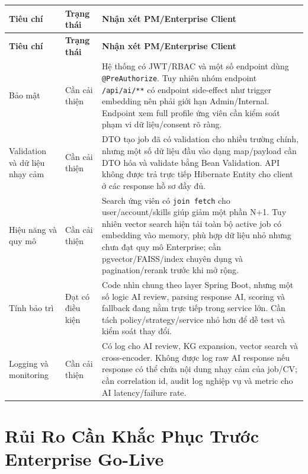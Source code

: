 \documentclass[12pt, a4paper]{report}
\begin{document}
\begin{longtable}{|p{3.2cm}|p{3cm}|p{8cm}|}
\hline
\textbf{Tiêu chí} & \textbf{Trạng thái} & \textbf{Nhận xét PM/Enterprise Client} \\
\hline
\endfirsthead
\hline
\textbf{Tiêu chí} & \textbf{Trạng thái} & \textbf{Nhận xét PM/Enterprise Client} \\
\hline
\endhead
Bảo mật & Cần cải thiện & Hệ thống có JWT/RBAC và một số endpoint dùng \texttt{@PreAuthorize}. Tuy nhiên nhóm endpoint \texttt{/api/ai/**} có endpoint side-effect như trigger embedding nên phải giới hạn Admin/Internal. Endpoint xem full profile ứng viên cần kiểm soát phạm vi dữ liệu/consent rõ ràng. \\
\hline
Validation và dữ liệu nhạy cảm & Cần cải thiện & DTO tạo job đã có validation cho nhiều trường chính, nhưng một số dữ liệu đầu vào dạng map/payload cần DTO hóa và validate bằng Bean Validation. API không được trả trực tiếp Hibernate Entity cho client ở các response hồ sơ đầy đủ. \\
\hline
Hiệu năng và quy mô & Cần cải thiện & Search ứng viên có \texttt{join fetch} cho user/account/skills giúp giảm một phần N+1. Tuy nhiên vector search hiện tải toàn bộ active job có embedding vào memory, phù hợp dữ liệu nhỏ nhưng chưa đạt quy mô Enterprise; cần pgvector/FAISS/index chuyên dụng và pagination/rerank trước khi mở rộng. \\
\hline
Tính bảo trì & Đạt có điều kiện & Code nhìn chung theo layer Spring Boot, nhưng một số logic AI review, parsing response AI, scoring và fallback đang nằm trực tiếp trong service lớn. Cần tách policy/strategy/service nhỏ hơn để dễ test và kiểm soát thay đổi. \\
\hline
Logging và monitoring & Cần cải thiện & Có log cho AI review, KG expansion, vector search và cross-encoder. Không được log raw AI response nếu response có thể chứa nội dung nhạy cảm của job/CV; cần correlation id, audit log nghiệp vụ và metric cho AI latency/failure rate. \\
\hline
\end{longtable}

\section{Rủi Ro Cần Khắc Phục Trước Enterprise Go-Live}
\end{document}
